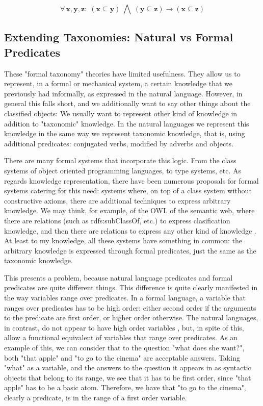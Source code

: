 \documentclass{IOS-Book-Article}     %
\begin{document}
\begin{equation}
\forall\,\mathbf{x\mathrm{,\mathbf{y\mathrm{,\mathbf{z}:\;\left(\mathbf{x\subseteq y}\right)\:\bigwedge\:\left(\mathbf{y\subseteq\mathbf{z}}\right)\rightarrow\left(\mathbf{x\subseteq\mathbf{z}}\right)}}}}
\end{equation}

\subsection{Extending Taxonomies: Natural vs Formal Predicates}
These "formal taxonomy" theories have limited usefulness. They allow us to
represent, in a formal or mechanical system, a certain knowledge that we
previously had informally, as expressed in the natural language. However,
in general this falls short, and we additionally want to say other things about
the classified objects: We usually want to represent other kind of knowledge
in addition to "taxonomic" knowledge. In the natural languages we represent
this knowledge in the same way we represent taxonomic knowledge, that is,
using additional predicates: conjugated verbs, modified by adverbs and objects.

There are many formal systems that incorporate this  logic.
From the class systems of object oriented programming languages,
to type systems, etc. As regards knowledge representation,
there have been numerous proposals for formal systems catering for this need:
systems where, on top of a class system without constructive axioms, there are
additional techniques to express arbitrary knowledge. We may think, for example,
of the OWL of the semantic web, where there are relations (such as
rdfs:subClassOf, etc.)
to express clasification knowledge, and then there are relations to express
any other kind of knowledge \cite{r3}. At least to my knowledge, all these
systems have something in common: the arbitrary knowledge is expressed through
formal predicates, just the same as the taxonomic knowledge.

This presents a problem, because natural language predicates and formal
predicates are quite different things. This difference is quite clearly
manifested in the way variables range over predicates. In a formal language,
a variable that ranges over predicates has to be high order: either second
order if the arguments to the predicate are first order, or higher order
otherwise. The natural languages, in contrast, do not appear to have high
order variables \cite{8}, but, in spite of this, allow a functional
equivalent of variables that range over predicates. As an example of this,
we can consider that to the question "what does she want?", both "that apple"
and "to go to the cinema" are acceptable answers. Taking "what" as
a variable, and the answers to the question it appears in as
syntactic objects that belong to its range,
we see that it has to be first order, since "that apple" has to be
a basic atom. Therefore, we have that "to go to the cinema",
clearly a predicate, is in the range of a first order variable.
\end{document}
